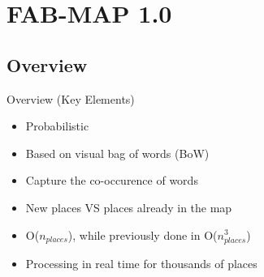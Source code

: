 \section{FAB-MAP 1.0}

\subsection{Overview}
\begin{frame}{Overview (Key Elements)}
    \begin{itemize}
        \item Probabilistic
        \item Based on visual bag of words (BoW)
        \item Capture the co-occurence of words
        \item New places VS places already in the map
        \item O($n_{places}$), while previously done in O($n_{places}^3$)
        \item Processing in real time for thousands of places
    \end{itemize}
\end{frame}


